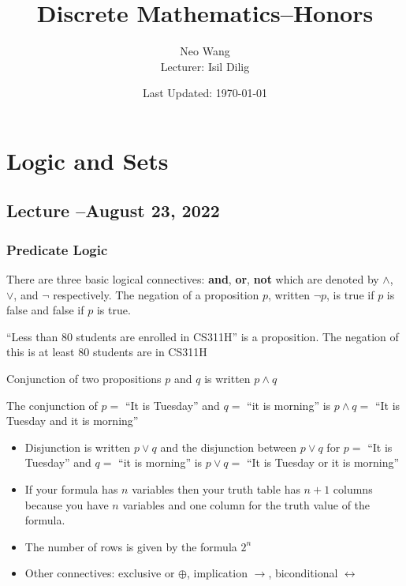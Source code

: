 \documentclass{scrreprt}
\title{Discrete Mathematics--Honors}
\author{Neo Wang\\ Lecturer: Isil Dilig}
\date{Last Updated: \today}
\begin{document}
\maketitle
\tableofcontents

\chapter{Logic and Sets}

\section{Lecture --August 23, 2022}
\subsection{Predicate Logic}

There are three basic logical connectives: \textbf{and}, \textbf{or}, \textbf{not}
which are denoted by $\land$, $\lor$, and $\neg$ respectively.
The negation of a proposition $p$, written $\neg p$, is true if $p$ is false and false if $p$ is true.

\begin{example}
	``Less than 80 students are enrolled in CS311H'' is a proposition. The negation of this is at least $80$ students are in CS311H
\end{example}

Conjunction of two propositions $p$ and $q$ is written $p\land q$

\begin{example}
	The conjunction of $p=$ ``It is Tuesday'' and $q=$ ``it is morning'' is $p\land q=$ ``It is Tuesday and it is morning''
\end{example}

\begin{itemize}
	\item Disjunction is written $p\lor q$ and the disjunction between $p\lor q$ for $p=$ ``It is Tuesday'' and $q=$ ``it is morning'' is $p\lor q=$ ``It is Tuesday or it is morning''
	\item If your formula has $n$ variables then your truth table has $n+1$ columns because you have $n$ variables and one column for the truth value of the formula.
	\item The number of rows is given by the formula $2^n$
	\item Other connectives: exclusive or $\oplus$, implication $\rightarrow$, biconditional $\leftrightarrow$
\end{itemize}
\end{document}
